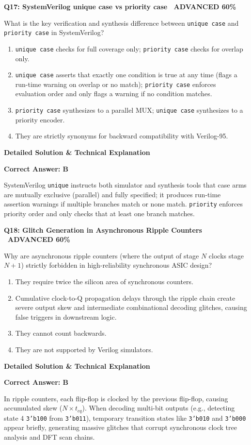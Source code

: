 \documentclass[11pt,a4paper]{article}
\newcommand{\badgeadv}{{\color{white}\colorbox{advred}{\bfseries\sffamily\tiny\ ADVANCED 60\%\ }}}
\newenvironment{qbox}[2]{%
  \begin{mdframed}[style=qstyle]%
  {\bfseries\sffamily\color{primaryblue}#1 \hfill #2}\par\vspace{2pt}%
}{%
  \end{mdframed}%
}
\newenvironment{ansbox}{%
  \begin{mdframed}[style=ansstyle]%
  {\bfseries\sffamily\color{ansgreen}\small Detailed Solution \& Technical Explanation}\par\vspace{2pt}\small%
}{%
  \end{mdframed}%
}
\begin{document}
\begin{qbox}{Q17: SystemVerilog unique case vs priority case}{\badgeadv}
What is the key verification and synthesis difference between \texttt{unique case} and \texttt{priority case} in SystemVerilog?
\begin{enumerate}[label=\textbf{\Alph*.}]
  \item \texttt{unique case} checks for full coverage only; \texttt{priority case} checks for overlap only.
  \item \texttt{unique case} asserts that exactly one condition is true at any time (flags a run-time warning on overlap or no match); \texttt{priority case} enforces evaluation order and only flags a warning if no condition matches.
  \item \texttt{priority case} synthesizes to a parallel MUX; \texttt{unique case} synthesizes to a priority encoder.
  \item They are strictly synonyms for backward compatibility with Verilog-95.
\end{enumerate}
\end{qbox}
\begin{ansbox}
\textbf{Correct Answer: B}

SystemVerilog \texttt{unique} instructs both simulator and synthesis tools that case arms are mutually exclusive (parallel) and fully specified; it produces run-time assertion warnings if multiple branches match or none match. \texttt{priority} enforces priority order and only checks that at least one branch matches.
\end{ansbox}

\begin{qbox}{Q18: Glitch Generation in Asynchronous Ripple Counters}{\badgeadv}
Why are asynchronous ripple counters (where the output of stage $N$ clocks stage $N+1$) strictly forbidden in high-reliability synchronous ASIC design?
\begin{enumerate}[label=\textbf{\Alph*.}]
  \item They require twice the silicon area of synchronous counters.
  \item Cumulative clock-to-Q propagation delays through the ripple chain create severe output skew and intermediate combinational decoding glitches, causing false triggers in downstream logic.
  \item They cannot count backwards.
  \item They are not supported by Verilog simulators.
\end{enumerate}
\end{qbox}
\begin{ansbox}
\textbf{Correct Answer: B}

In ripple counters, each flip-flop is clocked by the previous flip-flop, causing accumulated skew ($N \times t_{cq}$). When decoding multi-bit outputs (e.g., detecting state 4 \texttt{3'b100} from \texttt{3'b011}), temporary transition states like \texttt{3'b010} and \texttt{3'b000} appear briefly, generating massive glitches that corrupt synchronous clock tree analysis and DFT scan chains.
\end{ansbox}
\end{document}
